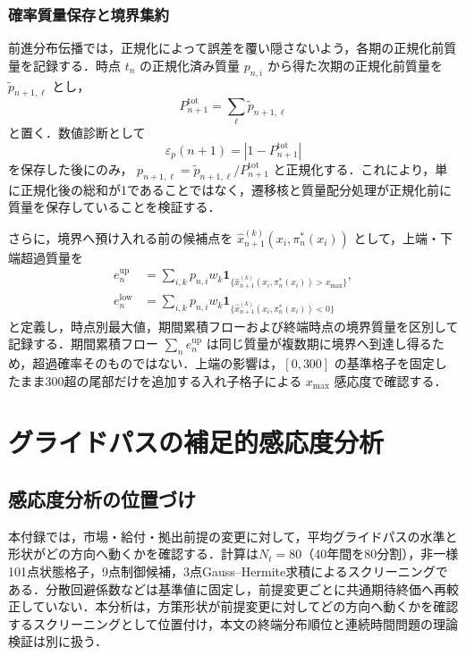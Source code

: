 \documentclass[10pt,a4paper]{article}
\theoremstyle{plain}
\theoremstyle{definition}
\newcommand{\one}{\mathbf{1}}
\begin{document}
\subsubsection{確率質量保存と境界集約}

前進分布伝播では，正規化によって誤差を覆い隠さないよう，各期の正規化前質量を記録する．時点 $t_n$ の正規化済み質量 $p_{n,i}$ から得た次期の正規化前質量を $\widetilde p_{n+1,\ell}$ とし，
\begin{equation}
  P_{n+1}^{\mathrm{tot}}=\sum_{\ell}\widetilde p_{n+1,\ell}
  \label{eq:mass-total}
\end{equation}
と置く．数値診断として
\begin{equation}
  \varepsilon_p(n+1)=\left|1-P_{n+1}^{\mathrm{tot}}\right|
  \label{eq:mass-error}
\end{equation}
を保存した後にのみ， $p_{n+1,\ell}=\widetilde p_{n+1,\ell}/P_{n+1}^{\mathrm{tot}}$ と正規化する．これにより，単に正規化後の総和が1であることではなく，遷移核と質量配分処理が正規化前に質量を保存していることを検証する．

さらに，境界へ預け入れる前の候補点を $\widehat{x}_{n+1}^{(k)}(x_i,\pi_n^*(x_i))$ として，上端・下端超過質量を
\begin{align}
  e_n^{\mathrm{up}}
  &=\sum_{i,k}p_{n,i}w_k\one_{\{\widehat{x}_{n+1}^{(k)}(x_i,\pi_n^*(x_i))>x_{\max}\}},\\
  e_n^{\mathrm{low}}
  &=\sum_{i,k}p_{n,i}w_k\one_{\{\widehat{x}_{n+1}^{(k)}(x_i,\pi_n^*(x_i))<0\}}
  \label{eq:boundary-excursion}
\end{align}
と定義し，時点別最大値，期間累積フローおよび終端時点の境界質量を区別して記録する．期間累積フロー $\sum_n e_n^{\mathrm{up}}$ は同じ質量が複数期に境界へ到達し得るため，超過確率そのものではない．上端の影響は，$[0,300]$ の基準格子を固定したまま300超の尾部だけを追加する入れ子格子による $x_{\max}$ 感応度で確認する．


\section{グライドパスの補足的感応度分析}
\label{sec:strict-clip-results}
\subsection{感応度分析の位置づけ}
本付録では，市場・給付・拠出前提の変更に対して，平均グライドパスの水準と形状がどの方向へ動くかを確認する．計算は$N_t=80$（40年間を80分割），非一様101点状態格子，9点制御候補，3点Gauss--Hermite求積によるスクリーニングである．分散回避係数などは基準値に固定し，前提変更ごとに共通期待終価へ再較正していない．本分析は，方策形状が前提変更に対してどの方向へ動くかを確認するスクリーニングとして位置付け，本文の終端分布順位と連続時間問題の理論検証は別に扱う．
\end{document}
